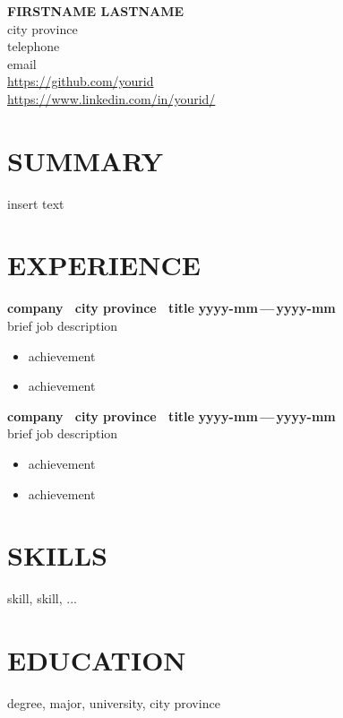 \documentclass[10pt, letterpaper, twoside]{article} %
\newcommand{\spacedemdash}{\,---\,} %
\begin{document}
\RaggedRight

\begin{center}
    \textbf{\large FIRSTNAME LASTNAME} \\
    city province \\
    telephone \\
    email \\
    \url{https://github.com/yourid} \\
    \url{https://www.linkedin.com/in/yourid/}
\end{center}


\section*{SUMMARY}
insert text

\section*{EXPERIENCE}

\noindent\textbf{company \textbar ~city province \textbar ~title} \hfill \textbf{yyyy-mm\spacedemdash yyyy-mm} \\
brief job description
\begin{itemize}
    \item achievement
    \item achievement
\end{itemize}
\vspace{8pt}

\noindent\textbf{company \textbar ~city province \textbar ~title} \hfill \textbf{yyyy-mm\spacedemdash yyyy-mm} \\
brief job description
\begin{itemize}
    \item achievement
    \item achievement
\end{itemize}
\vspace{8pt}

\section*{SKILLS}
skill, skill, ...

\section*{EDUCATION}
degree, major, university, city province
\end{document}

